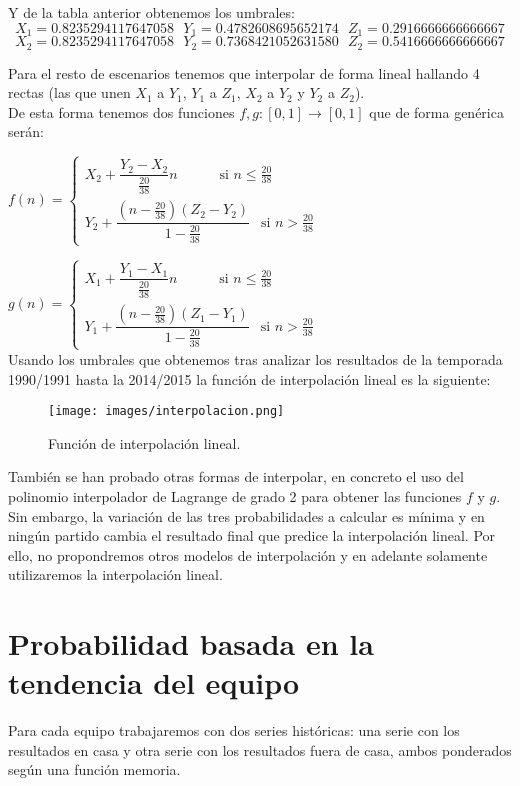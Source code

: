 Y de la tabla anterior obtenemos los umbrales:
$$X_{1}=0.8235294117647058 \ \ \ Y_{1}=0.4782608695652174 \ \ \ Z_{1}=0.2916666666666667$$
$$X_{2}=0.8235294117647058 \ \ \ Y_{2}=0.7368421052631580 \ \ \ Z_{2}=0.5416666666666667$$

Para el resto de escenarios tenemos que interpolar de forma lineal hallando 4 rectas (las que unen $X_{1}$ a $Y_{1}$, $Y_{1}$ a $Z_{1}$, $X_{2}$ a $Y_{2}$ y $Y_{2}$ a $Z_{2}$).\\

De esta forma tenemos dos funciones $f,g:[0,1] \longrightarrow [0,1]$ que de forma genérica serán:

$f(n)= \begin{cases}
X_{2}+\dfrac{Y_{2}-X_{2}}{\frac{20}{38}}n \ \ \ \ \ \ \ \ \ \ \ \ \text{    si } n\leq \frac{20}{38} \\
Y_{2}+\dfrac{(n-\frac{20}{38})(Z_{2}-Y_{2})}{1-\frac{20}{38}} \ \ \text{    si } n > \frac{20}{38}
\end{cases}$

$g(n)= \begin{cases}
X_{1}+\dfrac{Y_{1}-X_{1}}{\frac{20}{38}}n \ \ \ \ \ \ \ \ \ \ \ \ \text{    si } n\leq \frac{20}{38} \\
Y_{1}+\dfrac{(n-\frac{20}{38})(Z_{1}-Y_{1})}{1-\frac{20}{38}} \ \ \text{    si } n > \frac{20}{38}
\end{cases}$
\ \\

Usando los umbrales que obtenemos tras analizar los resultados de la temporada 1990/1991 hasta la 2014/2015 la función de interpolación lineal es la siguiente:

\begin{figure}[H]
	\centering
	\texttt{[image: images/interpolacion.png]}
	\caption{Función de interpolación lineal.}
\end{figure}

También se han probado otras formas de interpolar, en concreto el uso del polinomio interpolador de Lagrange de grado 2 para obtener las funciones $f$ y $g$. Sin embargo, la variación de las tres probabilidades a calcular es mínima y en ningún partido cambia el resultado final que predice la interpolación lineal. Por ello, no propondremos otros modelos de interpolación y en adelante solamente utilizaremos la interpolación lineal.  

\section{Probabilidad basada en la tendencia del equipo}
Para cada equipo trabajaremos con dos series históricas: una serie con los resultados en casa y otra serie con los resultados fuera de casa, ambos ponderados según una función memoria. \\

